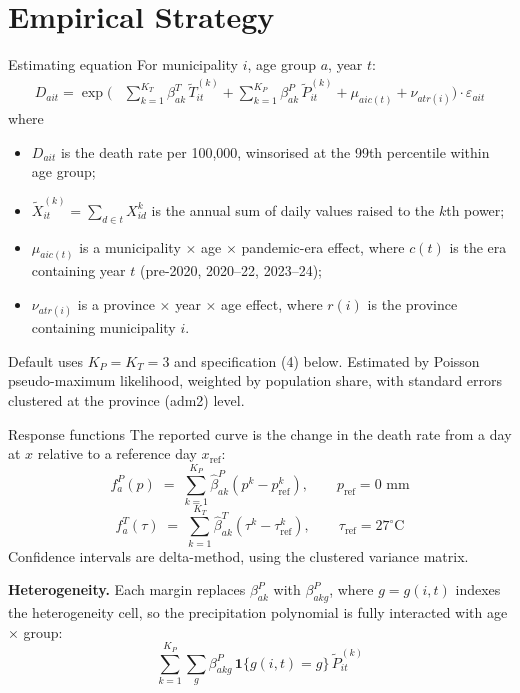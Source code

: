 \documentclass[10pt, aspectratio=169]{beamer}
\begin{document}
\section{Empirical Strategy}

\begin{frame}{Estimating equation}
  For municipality $i$, age group $a$, year $t$:
  \begin{align*}
    D_{ait} = \exp\Big(
      &\sum_{k=1}^{K_T} \beta^{T}_{ak}\, \widetilde{T}^{(k)}_{it}
      + \sum_{k=1}^{K_P} \beta^{P}_{ak}\, \widetilde{P}^{(k)}_{it}
      + \mu_{a i c(t)} + \nu_{a t r(i)} \Big) \cdot \varepsilon_{ait}
  \end{align*}
  where
  \begin{itemize}
    \item $D_{ait}$ is the death rate per 100,000, winsorised at the 99th
          percentile within age group;
    \item $\widetilde{X}^{(k)}_{it} = \sum_{d \in t} X_{id}^{k}$ is the annual
          sum of daily values raised to the $k$th power;
    \item $\mu_{a i c(t)}$ is a municipality $\times$ age $\times$
          pandemic-era effect, where $c(t)$ is the era containing year $t$
          (pre-2020, 2020--22, 2023--24);
    \item $\nu_{a t r(i)}$ is a province $\times$ year $\times$ age effect,
          where $r(i)$ is the province containing municipality $i$.
  \end{itemize}
  \vspace{0.3em}
  Default uses $K_P = K_T = 3$ and specification (4) below. Estimated by
  Poisson pseudo-maximum likelihood, weighted by
  population share, with standard errors clustered at the province (adm2)
  level.
\end{frame}

\begin{frame}{Response functions}
  The reported curve is the change in the death rate from a day at $x$ relative
  to a reference day $x_{\text{ref}}$:
  \[
    f^{P}_{a}(p) \;=\; \sum_{k=1}^{K_P} \hat\beta^{P}_{ak}
      \left( p^{k} - p_{\text{ref}}^{k} \right),
    \qquad p_{\text{ref}} = 0 \text{ mm}
  \]
  \[
    f^{T}_{a}(\tau) \;=\; \sum_{k=1}^{K_T} \hat\beta^{T}_{ak}
      \left( \tau^{k} - \tau_{\text{ref}}^{k} \right),
    \qquad \tau_{\text{ref}} = 27^{\circ}\mathrm{C}
  \]
  Confidence intervals are delta-method, using the clustered variance matrix.

  \vspace{0.8em}
  \textbf{Heterogeneity.} Each margin replaces $\beta^{P}_{ak}$ with
  $\beta^{P}_{akg}$, where $g = g(i,t)$ indexes the heterogeneity cell, so the
  precipitation polynomial is fully interacted with age $\times$ group:
  \[
    \sum_{k=1}^{K_P} \sum_{g} \beta^{P}_{akg}\,
      \mathbf{1}\{g(i,t) = g\}\, \widetilde{P}^{(k)}_{it}
  \]
\end{frame}
\end{document}
